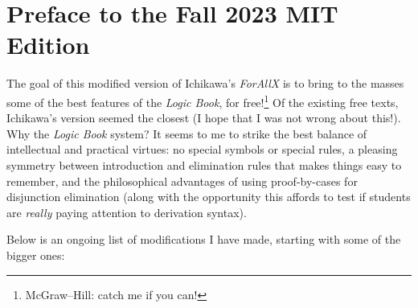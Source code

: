 
\chapter*{Preface to the Fall 2023 MIT Edition}
\label{ch.preface2}

The goal of this modified version of Ichikawa's \textit{ForAllX} is to bring to the masses some of the best features of the \textit{Logic Book}, for free!\footnote{McGraw--Hill: catch me if you can!} Of the existing free texts, Ichikawa's version seemed the closest (I hope that I was not wrong about this!). Why the \textit{Logic Book} system? It seems to me to strike the best balance of intellectual and practical virtues: no special symbols or special rules, a pleasing symmetry between introduction and elimination rules that makes things easy to remember, and the philosophical advantages of using proof-by-cases for disjunction elimination (along with the opportunity this affords to test if students are \textit{really} paying attention to derivation syntax). 

Below is an ongoing list of modifications I have made, starting with some of the bigger ones:

